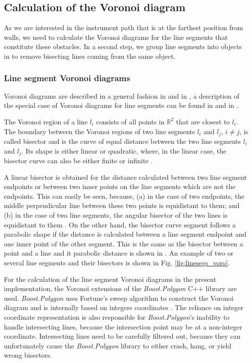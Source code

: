\subsection{Calculation of the Voronoi diagram}
As we are interested in the instrument path that is at the farthest position from walls, we need to calculate
the Voronoi diagrams for the line segments that constitute these obstacles. In a second step, we group line
segments into objects in to remove bisecting lines coming from the same object.


\subsubsection*{Line segment Voronoi diagrams}
Voronoi diagrams are described in a general fashion in \cite[Ch. 7, pp. 147f]{Berg2008} and in
\cite[Ch. 5, pp. 209f]{Berg2008}, a description of the special case of Voronoi diagrams for line segments can be
found in \cite[Ch. 7.3, pp. 160-163]{Berg2008} and in \cite[pp. 242-247]{FUH_geo2020}.

The Voronoi region of a line $l_i$ consists of all points in $\mathbb{R}^2$ that are closest to $l_i$. 
The boundary between the Voronoi regions of two line segments $l_i$ and $l_j$, $i \neq j$, 
is called bisector and is the curve of equal distance between the two line segments $l_i$ and $l_j$.
Its shape is either linear or quadratic, where, in the linear case, the bisector curve can also be either
finite or infinite \cite[pp. 243-244]{FUH_geo2020}.

A linear bisector is obtained for the distance calculated between two line segment endpoints or between two inner 
points on the line segments which are not the endpoints.
This can easily be seen, because, (a) in the case of two endpoints, the middle perpendicular line between these 
two points is equidistant to them; and (b) in the case of two line segments, the angular bisector of the two lines is
equidistant to them \cite[pp. 243-244]{FUH_geo2020}.
On the other hand, the bisector curve segment follows a parabolic shape if the distance is calculated 
between a line segment endpoint and one inner point of the other segment. This is the same as the bisector between
a point and a line and it parabolic distance is shown in \cite[pp. 260-261]{FUH_geo2020}.
An example of two or several line segments and their bisectors is shown in Fig. \ref{fig:linesegs_voro}.

For the calculation of the line segment Voronoi diagrams in the present implementation, the Voronoi extensions
\cite{web_boost_polygon_voronoi} of the \textit{Boost.Polygon} \cite{web_boost_polygon, Simonson2009} 
C++ library are used.
\textit{Boost.Polygon} uses Fortune's sweep algorithm \cite{Fortune1987} to construct the Voronoi diagram and is
internally based on integers coordinates \cite{web_boost_polygon}.
The reliance on integer coordinate representation is also responsible for \textit{Boost.Polygon}'s inability to handle
intersecting lines, because the intersection point may be at a non-integer coordinate. Intersecting lines need
to be carefully filtered out, because they can unfortunately cause the \textit{Boost.Polygon} library to either crash, 
hang, or yield wrong bisectors.

